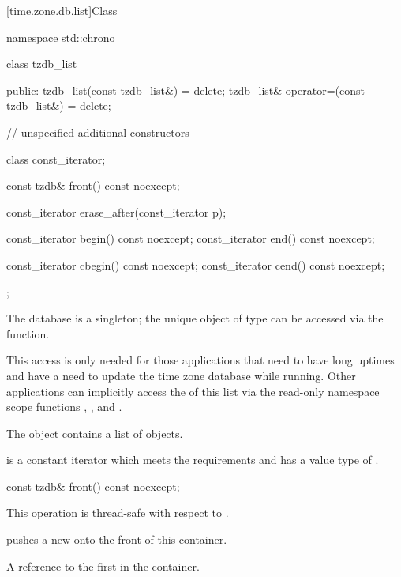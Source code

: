 [time.zone.db.list]{Class }

\begin{codeblock}
namespace std::chrono {
  class tzdb_list {
  public:
    tzdb_list(const tzdb_list&) = delete;
    tzdb_list& operator=(const tzdb_list&) = delete;

    // unspecified additional constructors

    class const_iterator;

    const tzdb& front() const noexcept;

    const_iterator erase_after(const_iterator p);

    const_iterator begin() const noexcept;
    const_iterator end()   const noexcept;

    const_iterator cbegin() const noexcept;
    const_iterator cend()   const noexcept;
  };
}
\end{codeblock}

\pnum
The  database is a singleton;
the unique object of type  can be
accessed via the  function.
\begin{note}
This access is only needed for those applications
that need to have long uptimes and
have a need to update the time zone database while running.
Other applications can implicitly access the  of this list
via the read-only namespace scope functions
,
, and
.
\end{note}
The  object contains a list of  objects.

\pnum
{} is a constant iterator
which meets the  requirements
and has a value type of .

%
\begin{itemdecl}
const tzdb& front() const noexcept;
\end{itemdecl}

\begin{itemdescr}
\pnum
\sync
This operation is thread-safe with respect to .
\begin{note}
 pushes a new 
onto the front of this container.
\end{note}

\pnum
\returns
A reference to the first  in the container.
\end{itemdescr}

